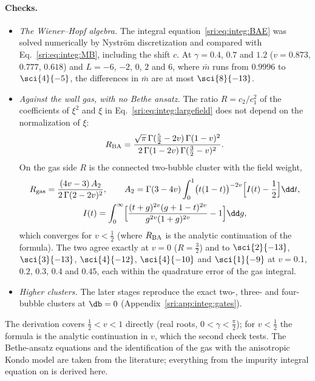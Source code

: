 \paragraph{Checks.}
\begin{itemize}
\item \emph{The Wiener--Hopf algebra.} The integral equation~\eqref{sri:eq:integ:BAE} was solved numerically by Nystr\"om
 discretization and compared with Eq.~\eqref{sri:eq:integ:MB}, including the shift $c$. At $\gamma=0.4$, $0.7$ and $1.2$
 ($v=0.873$, $0.777$, $0.618$) and $L=-6$, $-2$, $0$, $2$ and $6$, where $\bar m$ runs from $0.9996$ to $\sci{4}{-5}$,
 the differences in $\bar m$ are at most $\sci{8}{-13}$.
\item \emph{Against the wall gas, with no Bethe ansatz.} The ratio $R=c_2/c_1^2$ of the coefficients of $\xi^2$ and
 $\xi$ in Eq.~\eqref{sri:eq:integ:largefield} does not depend on the normalization of $\xi$:
 \begin{equation}
  R_{\rm BA}=\frac{\sqrt\pi\,\Gamma(\frac52-2v)\,\Gamma(1-v)^2}{2\,\Gamma(1-2v)\,\Gamma(\frac32-v)^2}.
 \end{equation}
 On the gas side $R$ is the connected two-bubble cluster with the field weight,
 \begin{equation}
 \begin{gathered}
  R_{\rm gas}=\frac{(4v-3)\,A_2}{2\,\Gamma(2-2v)^2},\qquad
  A_2=\Gamma(3-4v)\int_0^1\bigl(t(1-t)\bigr)^{-2v}\Bigl[I(t)-\frac12\Bigr]\dd t,\\
  I(t)=\int_0^\infty\Bigl[\frac{(t+g)^{2v}(g+1-t)^{2v}}{g^{2v}(1+g)^{2v}}-1\Bigr]\dd g,
 \end{gathered}
 \end{equation}
 which converges for $v<\frac12$ (where $R_{\rm BA}$ is the analytic continuation of the formula). The two agree
 exactly at $v=0$ ($R=\frac32$) and to $\sci{2}{-13}$, $\sci{3}{-13}$, $\sci{4}{-12}$, $\sci{4}{-10}$ and $\sci{1}{-9}$
 at $v=0.1$, $0.2$, $0.3$, $0.4$ and $0.45$, each within the quadrature error of the gas integral.
\item \emph{Higher clusters.} The later stages reproduce the exact two-, three- and four-bubble clusters at $\db=0$
 (Appendix~\ref{sri:app:integ:gates}).
\end{itemize}
The derivation covers $\frac12<v<1$ directly (real roots, $0<\gamma<\frac\pi2$); for $v<\frac12$ the formula is the
analytic continuation in $v$, which the second check tests. The Bethe-ansatz equations and the identification of the
gas with the anisotropic Kondo model are taken from the literature; everything from the impurity integral equation
on is derived here.

